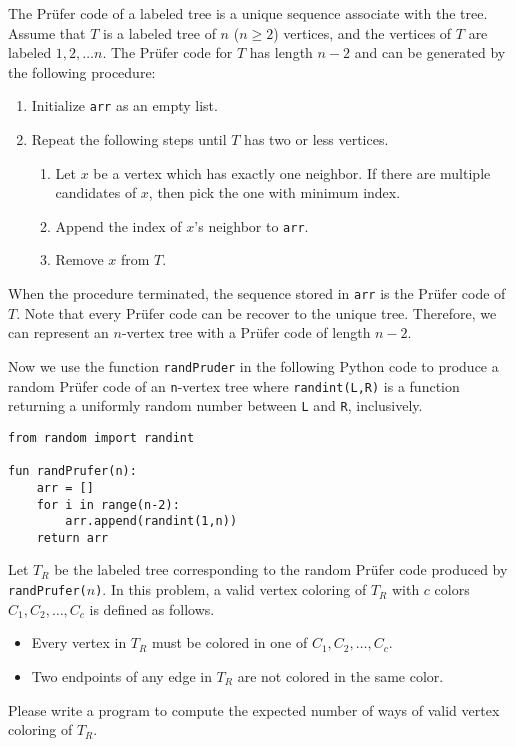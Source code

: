 The Prüfer code of a labeled tree is a unique sequence associate with the tree.
Assume that $T$ is a labeled tree of $n$ ($n\ge 2$) vertices, and the vertices of $T$ 
are labeled $1,2,\ldots n$.
The Prüfer code for $T$ has length $n-2$ and 
can be generated by the following procedure:
\begin{enumerate}
\tightlist
\item Initialize \verb+arr+ as an empty list.
\item Repeat the following steps until $T$ has two or less vertices.
\begin{enumerate}
\tightlist
\item Let $x$ be a vertex which has exactly one neighbor. 
      If there are multiple candidates of $x$, 
      then pick the one with minimum index.
\item Append the index of $x$'s neighbor to \verb+arr+.
\item Remove $x$ from $T$.
\end{enumerate}
\end{enumerate}
When the procedure terminated, the sequence stored in \verb+arr+ 
is the Prüfer code of $T$. 
Note that every Prüfer code can be recover to the unique tree.
Therefore, we can represent an $n$-vertex tree with a Prüfer code of length
$n-2$.

Now we use the function \verb+randPruder+ in the following Python code 
to produce a random Prüfer code of an \verb+n+-vertex tree 
where \verb+randint(L,R)+ is a function returning a uniformly random 
number between \verb+L+ and \verb+R+, inclusively.

\begin{verbatim}
from random import randint

fun randPrufer(n):
    arr = []
    for i in range(n-2):
        arr.append(randint(1,n))
    return arr
\end{verbatim}

Let $T_R$ be the labeled tree corresponding to the random Prüfer code 
produced by  \verb+randPrufer(+$n$\verb+)+.
In this problem, a valid vertex coloring of $T_R$ with $c$ colors 
$C_1,C_2,\dots,C_c$ is defined as follows.
\begin{itemize}
\item Every vertex in $T_R$ must be colored in one of $C_1,C_2,\dots,C_c$.
\item Two endpoints of any edge in $T_R$ are not colored in the same color.
\end{itemize}

Please write a program to compute the expected number of ways of valid vertex 
coloring of $T_R$. 
